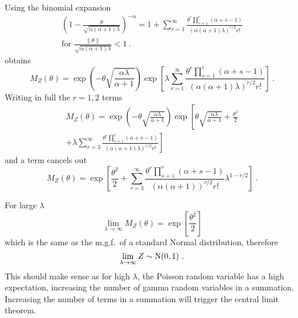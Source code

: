 Using the binomial expansion 
\begin{multline}
  \left(
    1-\frac{\theta}{\sqrt{\alpha(\alpha+1)\lambda}}
  \right)^{-\alpha}
  =
  1+
  \sum_{r=1}^\infty \frac{\theta^r\prod_{s=1}^r(\alpha+s-1)}{(\alpha(\alpha+1)\lambda)^{r/2}r!}
  \\
  \text{for }\frac{\|\theta\|}{\sqrt{\alpha(\alpha+1)\lambda}}<1 \ .
\end{multline}
obtains
\begin{equation}
  M_Z(\theta)=
  \exp\left(
      -\theta\sqrt{\frac{\alpha\lambda}{\alpha+1}}
    \right)
  \exp\left[
    \lambda
    \sum_{r=1}^\infty \frac{\theta^r\prod_{s=1}^r(\alpha+s-1)}{(\alpha(\alpha+1)\lambda)^{r/2}r!}
  \right]
  \ .
\end{equation}
Writing in full the $r=1,2$ terms
\begin{multline*}
  M_Z(\theta)=
  \exp\left(
      -\theta\sqrt{\frac{\alpha\lambda}{\alpha+1}}
    \right)
  \exp\left[
    \theta\sqrt{\frac{\alpha\lambda}{\alpha+1}}
    +\frac{\theta^2}{2}
  \right.
  \\
  \left.
    +\lambda\sum_{r=3}^\infty \frac{\theta^r\prod_{s=1}^r(\alpha+s-1)}{(\alpha(\alpha+1)\lambda)^{r/2}r!}
  \right]
\end{multline*}
and a term cancels out
\begin{equation}
  M_Z(\theta)=
  \exp\left[
    \frac{\theta^2}{2}
    +\sum_{r=3}^\infty
    \frac
      {\theta^r\prod_{s=1}^r(\alpha+s-1)}
      {(\alpha(\alpha+1))^{r/2}r!}
    \lambda^{1-r/2}
  \right]
  \ .
\end{equation}

For large $\lambda$
\begin{equation}
  \lim_{\lambda\rightarrow\infty}M_Z(\theta)=\exp\left[\frac{\theta^2}{2}\right]
\end{equation}
which is the same as the m.g.f.~of a standard Normal distribution, therefore
\begin{equation}
  \lim_{\lambda\rightarrow\infty}Z\sim\operatorname{N}(0,1) \ .
\end{equation}
This should make sense as for high $\lambda$, the Poisson random variable has a high expectation, increasing the number of gamma random variables in a summation. Increasing the number of terms in a summation will trigger the central limit theorem.

